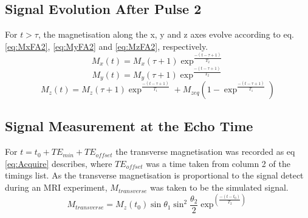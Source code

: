\subsection{Signal Evolution After Pulse 2}
For $t > \tau$, the magnetisation along the x, y and z axes evolve according to eq. \ref{eq:MxFA2}, \ref{eq:MyFA2} and \ref{eq:MzFA2}, respectively.
\begin{equation}  \label{eq:MxFA2}
M_{x}(t) = M_{x}(\tau + 1)\exp^{\frac{-(t-\tau +1) }{T_{2}} }
\end{equation}
\begin{equation}  \label{eq:MyFA2}
M_{y}(t) = M_{y}(\tau + 1)\exp^{\frac{-(t-\tau +1) }{T_{2}} }
\end{equation}
\begin{equation} \label{eq:MzFA2}
M_{z}(t) = M_{z}(\tau + 1)\exp^{\frac{-(t-\tau+1)}{T_{1}}} + M_{zeq}(1-\exp^{\frac{-(t-\tau + 1)}{T_{1}}})
\end{equation}
\subsection{Signal Measurement at the Echo Time}
For $t = t_0 + TE_{min} + TE_{offset}$ the transverse magnetisation was recorded as eq \ref{eq:Acquire}
describes, where $TE_{offset}$ was a time taken from column 2 of the timings list. As the transverse magnetisation is proportional to the signal detect during an MRI experiment, $M_{transverse}$ was taken to be the simulated signal.
\begin{equation} \label{eq:Acquire}
M_{transverse} = M_{z}(t_{0})\sin{\theta_{1}}\sin^2{\frac{\theta_{2}}{2}}\exp^(\frac{-(t-t_{0})}{T_{2}})
\end{equation}

